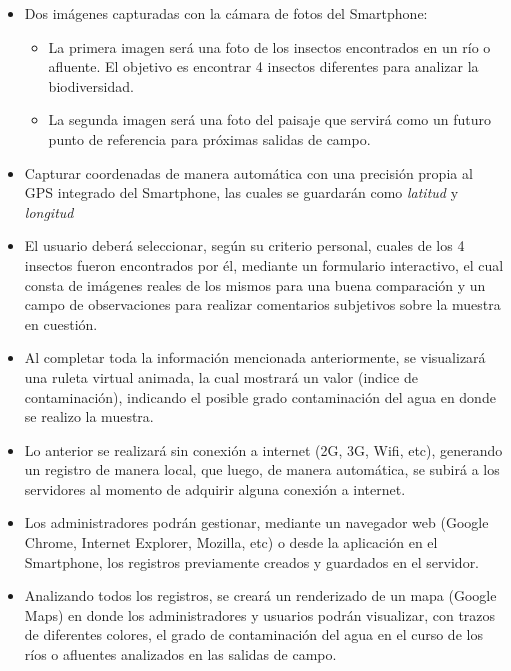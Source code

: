       \begin{itemize}
        \item Dos imágenes capturadas con la cámara de fotos del Smartphone:
        
        \begin{itemize}
          \item La primera imagen será una foto de los insectos encontrados en un río o afluente. El objetivo es encontrar 4 insectos diferentes para analizar la biodiversidad.
         
          \item La segunda imagen será una foto del paisaje que servirá como un futuro punto de referencia para próximas salidas de campo. 
        \end{itemize}
        
        \item Capturar coordenadas de manera automática con una precisión propia al GPS integrado del Smartphone, las cuales se guardarán como \emph{latitud} y \emph{longitud}
        
        \item El usuario deberá seleccionar, según su criterio personal, cuales de los 4 insectos fueron encontrados por él, mediante un formulario interactivo, el cual consta de imágenes reales de los mismos para una buena comparación y un campo de observaciones para realizar comentarios subjetivos sobre la muestra en cuestión.
        
        \item Al completar toda la información mencionada anteriormente, se visualizará una ruleta virtual animada, la cual mostrará un valor (indice de contaminación), indicando el posible grado contaminación del agua en donde se realizo la muestra.

        \item Lo anterior se realizará sin conexión a internet (2G, 3G, Wifi, etc), generando un registro de manera local, que luego, de manera automática, se subirá a los servidores al momento de adquirir alguna conexión a internet.

        \item Los administradores podrán gestionar, mediante un navegador web (Google Chrome, Internet Explorer, Mozilla, etc) o desde la aplicación en el Smartphone, los registros previamente creados y guardados en el servidor.

        \item Analizando todos los registros, se creará un renderizado de un mapa  (Google Maps) en donde los administradores y usuarios podrán visualizar, con trazos de diferentes colores, el grado de contaminación del agua en el curso de los ríos o afluentes analizados en las salidas de campo.
      \end{itemize}


